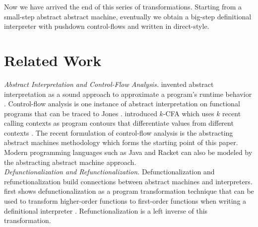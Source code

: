 \documentclass[acmsmall, review]{acmart}\settopmatter{}
\begin{document}
Now we have arrived the end of this series of transformations. Starting from a
small-step abstract abstract machine, eventually we obtain a big-step definitional
interpreter with pushdown control-flows and written in direct-style.


\section{Related Work}\label{sec:related}

\textit{Abstract Interpretation and Control-Flow Analysis.}
\citeauthor{cousot1977abstract} invented abstract interpretation as a sound approach to
approximate a program's runtime behavior \cite{cousot1977abstract}. Control-flow analysis
is one instance of abstract interpretation on functional programs that can be traced to
Jones \cite{jones1981flow}. \citeauthor{Shivers:1988:CFA:53990.54007} introduced $k$-CFA
which uses $k$ recent calling contexts as program contours that differentiate values from
different contexts \cite{Shivers:1988:CFA:53990.54007, Shivers:1991:SSC:115865.115884}.
The recent formulation of control-flow analysis is the abstracting abstract machines
methodology \cite{van2012systematic, van2010abstracting} which forms the starting point
of this paper. Modern programming languages such as Java \cite{might2010resolving} and
Racket \cite{Tobin-Hochstadt:2012:HSE:2384616.2384655} can also be modeled by the abstracting
abstract machine approach. \\

\textit{Defunctionalization and Refunctionalization.}
Defunctionalization and refunctionalization build connections between abstract machines and
interpreters. \citeauthor{Reynolds:72} first shows defunctionalization as a program transformation 
technique that can be used to transform higher-order functions to first-order functions when
writing a definitional interpreter \cite{Reynolds:72, Reynolds:HOSC98-revisited}.
Refunctionalization is a left inverse of this transformation.
\end{document}
